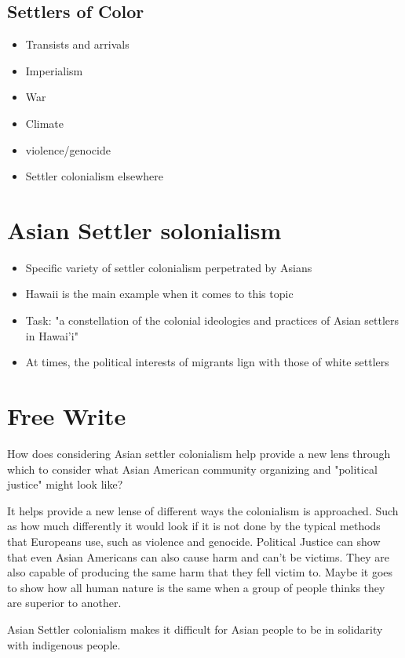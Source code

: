\documentclass{article}
\begin{document}
\subsection{Settlers of Color}

\begin{itemize}
  \item Transists and arrivals
  \item Imperialism
  \item War
  \item Climate
  \item violence/genocide
  \item Settler colonialism elsewhere
\end{itemize}

\section*{Asian Settler solonialism}
\begin{itemize}
  \item Specific variety of settler colonialism perpetrated by Asians
  \item Hawaii is the main example when it comes to this topic
  \item Task: "a constellation of the colonial ideologies and practices of Asian settlers in Hawai'i"
  \item At times, the political interests of migrants lign with those of white settlers
\end{itemize}

\section*{Free Write}
How does considering Asian settler colonialism help provide a new lens through which
to consider what Asian American community organizing and "political justice"
might look like?

It helps provide a new lense of different ways the colonialism is approached.
Such as how much differently it would look if it is not done by the typical methods
that Europeans use, such as violence and genocide.
Political Justice can show that even Asian Americans can also cause harm and can't
be victims. They are also capable of producing the same harm that they fell victim to.
Maybe it goes to show how all human nature is the same when a group of people
thinks they are superior to another.

Asian Settler colonialism makes it difficult for
Asian people to be in solidarity with indigenous people.
\end{document}

